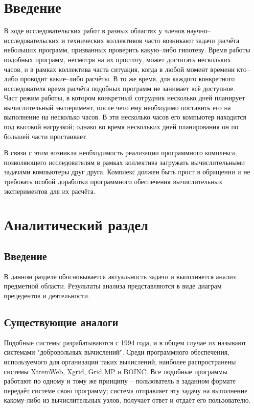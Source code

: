 \documentclass[a4paper,12pt]{report}
\numberwithin{equation}{section}
\begin{document}
  \clearpage
  \section*{Введение}
  
  В ходе исследовательских работ в разных областях у членов научно--исследовательских и технических коллективов часто возникают задачи расчёта небольших программ, призванных проверить какую--либо гипотезу. 
  Время работы подобных программ, несмотря на их простоту, может достигать нескольких часов, и в рамках коллектива часта ситуация, когда в любой момент времени кто--либо проводит какие--либо расчёты. 
  В то же время, для каждого конкретного исследователя время расчёта подобных программ не занимает всё доступное. 
  Част режим работы, в котором конкретный сотрудник несколько дней планирует вычислительный эксперимент, после чего ему необходимо поставить его на выполнение на несколько часов. 
  В эти несколько часов его компьютер находится под высокой нагрузкой; однако во время нескольких дней планирования он по большей части простаивает.
  
  В связи с этим возникла необходимость реализации программного комплекса, позволяющего исследователям в рамках коллектива загружать вычислительными задачами компьютеры друг друга.
  Комплекс должен быть прост в обращении и не требовать особой доработки программного обеспечения вычислительных экспериментов для их расчёта.
  
  \clearpage
  \section{Аналитический раздел}
  \subsection{Введение}
  В данном разделе обосновывается актуальность задачи и выполняется анализ предметной области.
  Результаты анализа представляются в виде диаграм прецедентов и деятельности.
  
  \subsection{Существующие аналоги}
  
  Подобные системы разрабатываются с 1994 года, и в общем случае их называют системами "добровольных вычислений".
  Среди программного обеспечения, используемого для организации таких вычислений, наиболее распространены системы XtremWeb, Xgrid, Grid MP и BOINC.
  Все подобные программы работают по одному и тому же принципу -- пользователь в заданном формате передаёт системе свою программу; система отправляет эту задачу на выполнение какому-либо из вычислительных узлов, получает ответ и отдаёт его пользователю.
  
\end{document}
